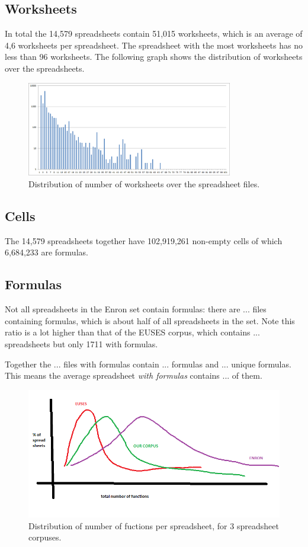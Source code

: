 \documentclass[conference]{IEEEtran}
\begin{document}
\subsection{Worksheets}
In total the 14,579 spreadsheets contain 51,015 worksheets, which is an average of 4,6 worksheets per spreadsheet. The spreadsheet with the most worksheets has no less than 96 worksheets. The following graph shows the distribution of worksheets over the spreadsheets.

\begin{figure}[ht!]
\centering
\includegraphics[width=90mm]{figures/Worksheets.png}
\caption{Distribution of number of worksheets over the spreadsheet files.}
\label{overflow}
\end{figure}

\subsection{Cells}
The 14,579 spreadsheets together have 102,919,261 non-empty cells of which 6,684,233 are formulas.

\subsection{Formulas}
Not all spreadsheets in the Enron set contain formulas: there are ... files containing formulas, which is about half of all spreadsheets in the set. Note this ratio is a lot higher than that of the EUSES corpus, which contains ... spreadsheets but only 1711 with formulas.

Together the ... files with formulas contain ... formulas and ... unique formulas. This means the average spreadsheet \emph{with formulas} contains ... of them.



\begin{figure}[!t]
\centering
\includegraphics[width=\columnwidth]{functions.png}
\caption{Distribution of number of fuctions per spreadsheet, for 3 spreadsheet corpuses.}
\label{fig:functions}
\end{figure}
\end{document}
